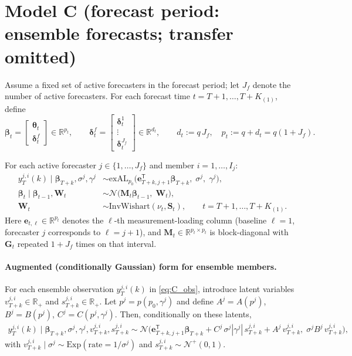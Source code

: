 \documentclass[11pt]{article}
\newcommand{\R}{\mathbb{R}}
\newcommand{\1}{\mathbb{I}}
\newcommand{\N}{\mathcal{N}}
\newcommand{\IW}{\mathrm{InvWishart}}
\newcommand{\Exp}{\mathrm{Exp}}
\newcommand{\T}{\mathsf{T}}
\begin{document}
\section{Model C (forecast period: ensemble forecasts; transfer omitted)}

Assume a fixed set of active forecasters in the forecast period; let $J_f$ denote the number of active forecasters.
For each forecast time $t=T+1,\dots,T+K_{(1)}$, define
\[
\bm\beta_t=
\begin{bmatrix}
\bm\theta_t\\
\bm\delta_t^f
\end{bmatrix}\in\R^{p_t},
\qquad
\bm\delta_t^f=
\begin{bmatrix}
\bm\delta_t^1\\
\vdots\\
\bm\delta_t^{J_f}
\end{bmatrix}\in\R^{d_t},
\qquad
d_t := q\,J_f,
\quad
p_t := q+d_t = q(1+J_f).
\]

For each active forecaster $j\in\{1,\dots,J_f\}$ and member $i=1,\dots,I_j$:
\begin{align}
y_T^{j,i}(k)\mid \bm\beta_{T+k},\sigma^j,\gamma^j
&\sim \mathrm{exAL}_{p_0}\!\big(\bm e_{T+k,j+1}^\T\bm\beta_{T+k},\;\sigma^j,\;\gamma^j\big),\label{eq:C_obs}\\
\bm\beta_{t}\mid \bm\beta_{t-1},\bm W_t
&\sim \N\!\big(\bm M_t\bm\beta_{t-1},\;\bm W_t\big),\label{eq:C_state}\\
\bm W_t &\sim \IW(\nu_t,\bm S_t),\qquad t=T+1,\dots,T+K_{(1)}. \label{eq:C_IW}
\end{align}
Here $\bm e_{t,\ell}\in\R^{p_t}$ denotes the $\ell$-th measurement-loading column (baseline $\ell=1$, forecaster $j$ corresponds to $\ell=j+1$), and $\bm M_t\in\R^{p_t\times p_t}$ is block-diagonal with $\bm G_t$ repeated $1+J_f$ times on that interval.

\paragraph{Augmented (conditionally Gaussian) form for ensemble members.}
For each ensemble observation $y_T^{j,i}(k)$ in \eqref{eq:C_obs}, introduce latent variables
$v_{T+k}^{j,i}\in\R_+$ and $s_{T+k}^{j,i}\in\R_+$.
Let $p^j=p(p_0,\gamma^j)$ and define $A^j=A(p^j)$, $B^j=B(p^j)$, $C^j=C(p^j,\gamma^j)$.
Then, conditionally on these latents,
\begin{align}
y_T^{j,i}(k)\mid \bm\beta_{T+k},\sigma^j,\gamma^j,v_{T+k}^{j,i},s_{T+k}^{j,i}
\sim \N\!\Big(
\bm e_{T+k,j+1}^\T\bm\beta_{T+k} + C^j\,\sigma^j|\gamma^j|\,s_{T+k}^{j,i} + A^j\,v_{T+k}^{j,i},
\;\sigma^j B^j\,v_{T+k}^{j,i}
\Big),
\end{align}
with $v_{T+k}^{j,i}\mid\sigma^j\sim \Exp(\text{rate}=1/\sigma^j)$ and $s_{T+k}^{j,i}\sim \N^+(0,1)$.
\end{document}
